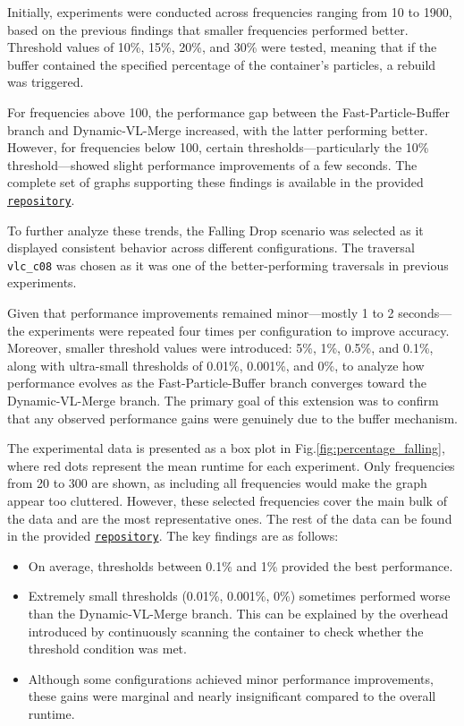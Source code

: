Initially, experiments were conducted across frequencies ranging from 10 to 1900, based on the previous findings that smaller frequencies performed better. Threshold values of 10\%, 15\%, 20\%, and 30\% were tested, meaning that if the buffer contained the specified percentage of the container's particles, a rebuild was triggered.

For frequencies above 100, the performance gap between the Fast-Particle-Buffer branch and Dynamic-VL-Merge increased, with the latter performing better. However, for frequencies below 100, certain thresholds—particularly the 10\% threshold—showed slight performance improvements of a few seconds. The complete set of graphs supporting these findings is available in the provided \href{https://github.com/xhulia028/GraphView}{\texttt{repository}}.


To further analyze these trends, the Falling Drop scenario was selected as it displayed consistent behavior across different configurations. The traversal \texttt{vlc\_c08} was chosen as it was one of the better-performing traversals in previous experiments.


Given that performance improvements remained minor—mostly 1 to 2 seconds—the experiments were repeated four times per configuration to improve accuracy. Moreover, smaller threshold values were introduced:  
5\%, 1\%, 0.5\%, and 0.1\%, along with ultra-small thresholds of 0.01\%, 0.001\%, and 0\%, to analyze how performance evolves as the Fast-Particle-Buffer branch converges toward the Dynamic-VL-Merge branch. The primary goal of this extension was to confirm that any observed performance gains were genuinely due to the buffer mechanism.


The experimental data is presented as a box plot in Fig.\ref{fig:percentage_falling}, where red dots represent the mean runtime for each experiment. Only frequencies from 20 to 300 are shown, as including all frequencies would make the graph appear too cluttered. However, these selected frequencies cover the main bulk of the data and are the most representative ones. The rest of the data can be found in the provided \href{https://github.com/xhulia028/GraphView}{\texttt{repository}}. The key findings are as follows:

\begin{itemize}
    \item On average, thresholds between 0.1\% and 1\% provided the best performance.
    \item Extremely small thresholds (0.01\%, 0.001\%, 0\%) sometimes performed worse than the Dynamic-VL-Merge branch. This can be explained by the overhead introduced by continuously scanning the container to check whether the threshold condition was met.
    \item Although some configurations achieved minor performance improvements, these gains were marginal and nearly insignificant compared to the overall runtime.
\end{itemize}




